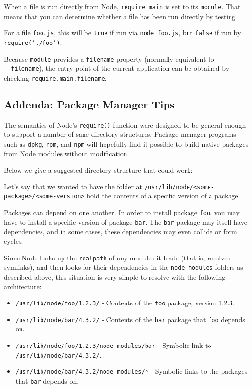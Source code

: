 When a file is run directly from Node, \texttt{require.main} is set to
its \texttt{module}. That means that you can determine whether a file
has been run directly by testing

\begin{Shaded}
\begin{Highlighting}[]
 
\end{Highlighting}
\end{Shaded}

For a file \texttt{foo.js}, this will be \texttt{true} if run via
\texttt{node foo.js}, but \texttt{false} if run by
\texttt{require('./foo')}.

Because \texttt{module} provides a \texttt{filename} property (normally
equivalent to \texttt{\_\_filename}), the entry point of the current
application can be obtained by checking \texttt{require.main.filename}.

\subsection{Addenda: Package Manager Tips}

The semantics of Node's \texttt{require()} function were designed to be
general enough to support a number of sane directory structures. Package
manager programs such as \texttt{dpkg}, \texttt{rpm}, and \texttt{npm}
will hopefully find it possible to build native packages from Node
modules without modification.

Below we give a suggested directory structure that could work:

Let's say that we wanted to have the folder at
\texttt{/usr/lib/node/\textless{}some-package\textgreater{}/\textless{}some-version\textgreater{}}
hold the contents of a specific version of a package.

Packages can depend on one another. In order to install package
\texttt{foo}, you may have to install a specific version of package
\texttt{bar}. The \texttt{bar} package may itself have dependencies, and
in some cases, these dependencies may even collide or form cycles.

Since Node looks up the \texttt{realpath} of any modules it loads (that
is, resolves symlinks), and then looks for their dependencies in the
\texttt{node\_modules} folders as described above, this situation is
very simple to resolve with the following architecture:

\begin{itemize}
\item
  \texttt{/usr/lib/node/foo/1.2.3/} - Contents of the \texttt{foo}
  package, version 1.2.3.
\item
  \texttt{/usr/lib/node/bar/4.3.2/} - Contents of the \texttt{bar}
  package that \texttt{foo} depends on.
\item
  \texttt{/usr/lib/node/foo/1.2.3/node\_modules/bar} - Symbolic link to
  \texttt{/usr/lib/node/bar/4.3.2/}.
\item
  \texttt{/usr/lib/node/bar/4.3.2/node\_modules/*} - Symbolic links to
  the packages that \texttt{bar} depends on.
\end{itemize}

